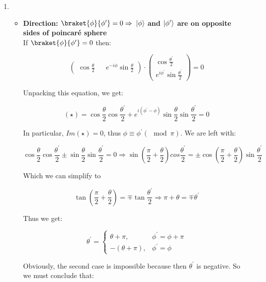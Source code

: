\documentclass[a4paper,10pt]{hw}
\DeclarePairedDelimiter\ket{\lvert}{\rangle}
\begin{document}
\begin{enumerate}

\item

\begin{itemize}

	\item \textbf{Direction: $\braket{\phi}{\phi^\prime} = 0 \Rightarrow$ $\ket{\phi}$ and $\ket{\phi^\prime}$ are on opposite sides of poincar\'{e} sphere } \\
	
	If $\braket{\phi}{\phi^\prime} = 0$ then:
	
	$$
	\begin{pmatrix}
	\cos{\frac{\theta}{2}} && e^{-i\phi}\sin{\frac{\theta}{2}}
	\end{pmatrix}
	\cdot
	\begin{pmatrix}
	\cos{\frac{\theta^\prime}{2}} \\ e^{i\phi^\prime}\sin{\frac{\theta^\prime}{2}}
	\end{pmatrix}
	=
	0
	$$

	Unpacking this equation, we get:
	
	$$
	(\star) = \cos{\frac{\theta}{2}} \cos{\frac{\theta^\prime}{2}} + e^{i(\phi^\prime - \phi)}\sin{\frac{\theta}{2}} \sin{\frac{\theta^\prime}{2}} = 0
	$$
	
	In particular, $Im(\star) = 0$, thus $\phi \equiv \phi^\prime(\mod\pi)$. We are left with:
	
	$$
	\cos{\frac{\theta}{2}} \cos{\frac{\theta^\prime}{2}} 
	\pm \sin{\frac{\theta}{2}} \sin{\frac{\theta^\prime}{2}} 
	= 0 
	\Rightarrow 
	\sin\left(\frac{\pi}{2} 
	+ \frac{\theta}{2}\right)cos{\frac{\theta^\prime}{2}} 
	= \pm \cos\left(\frac{\pi}{2} + \frac{\theta}{2}\right)\sin{\frac{\theta^\prime}{2}}
	$$
	
	Which we can simplify to
	
	$$
	\tan\left(\frac{\pi}{2} + \frac{\theta}{2}\right) = \mp\tan{\frac{\theta^\prime}{2}}
	\Rightarrow
	\pi + \theta = \mp\theta^\prime
	$$
	
	Thus we get:
	
	$$
	\theta^\prime = \begin{cases}
	\theta + \pi, & \phi^\prime = \phi + \pi \\
	-(\theta + \pi), & \phi^\prime = \phi \end{cases}
	$$
	
	Obviously, the second case is impossible because then $\theta^\prime$ is negative. So we must conclude that:
	

\end{itemize}
\end{enumerate}
\end{document}
